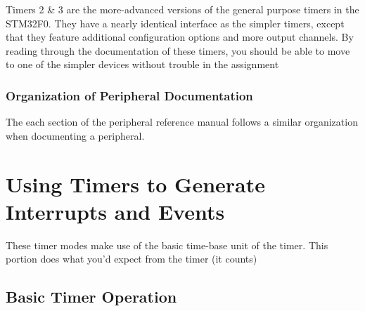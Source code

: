 \documentclass[11pt,fleqn]{book} %
\begin{document}
    Timers 2 \& 3 are the more-advanced versions of the general purpose timers in the STM32F0. They have a nearly identical interface as the simpler timers, except that they feature additional configuration options and more output channels. By reading through the documentation of these timers, you should be able to move to one of the simpler devices without trouble in the assignment 
    
    \subsubsection{Organization of Peripheral Documentation}
    The each section of the peripheral reference manual follows a similar organization when documenting a peripheral. 
    
    
%    
%    

\section{Using Timers to Generate Interrupts and Events}
    These timer modes make use of the basic time-base unit of the timer. 
    This portion does what you'd expect from the timer (it counts)
    
    \subsection{Basic Timer Operation}
    
\end{document}
